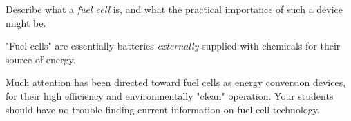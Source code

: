 

Describe what a {\it fuel cell} is, and what the practical importance of such a device might be.







"Fuel cells" are essentially batteries {\it externally} supplied with chemicals for their source of energy.







Much attention has been directed toward fuel cells as energy conversion devices, for their high efficiency and environmentally "clean" operation.  Your students should have no trouble finding current information on fuel cell technology.





